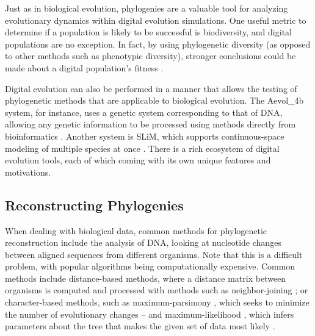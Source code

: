 

Just as in biological evolution, phylogenies are a valuable tool for analyzing evolutionary dynamics within digital evolution simulations.
One useful metric to determine if a population is likely to be successful is biodiversity, and digital populations are no exception.
In fact, by using phylogenetic diversity (as opposed to other methods such as phenotypic diversity), stronger conclusions could be made about a digital population's fitness \citep{hernandez2022phylogenetic}.

Digital evolution can also be performed in a manner that allows the testing of phylogenetic methods that are applicable to biological evolution.
The Aevol\_4b system, for instance, uses a genetic system corresponding to that of DNA, allowing any genetic information to be processed using methods directly from bioinformatics \citep{daudey2024aevol}.
Another system is SLiM, which supports continuous-space modeling of multiple species at once \citep{haller2023slim}.
There is a rich ecosystem of digital evolution tools, each of which coming with its own unique features and motivations.

\subsection{Reconstructing Phylogenies} \label{sec:introduction:reconst}

When dealing with biological data, common methods for phylogenetic reconstruction include the analysis of DNA, looking at nucleotide changes between aligned sequences from different organisms. Note that this is a difficult problem, with popular algorithms being computationally expensive.
Common methods include distance-based methods, where a distance matrix between organisms is computed and processed with methods such as neighbor-joining \citep{saitou1987neighbor}; or character-based methods, such as maximum-parsimony \citep{sober1991reconstructing}, which seeks to minimize the number of evolutionary changes -- and maximum-likelihood \citep{felsenstein1981evolutionary}, which infers parameters about the tree that makes the given set of data most likely \citep{de2014phylogenetic}.

